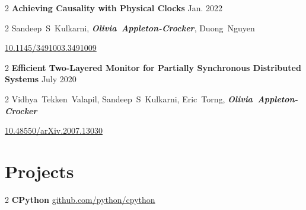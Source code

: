 \documentclass[10pt, letterpaper]{article}
\newenvironment{twocolentry}[2][]{ \onecolentry \def\secondColumn{#2} \setcolumnwidth{\fill, 4.5 cm}
\begin{paracol}{2} }{ \switchcolumn \raggedleft \secondColumn  \end{paracol}
\endonecolentry } %
\newcommand{\sectionoffset}{-0.12 cm}
\newcommand{\ssubsectiongap}{ 0.0953}
\newcommand{\ssubsectiongapd}{\fpeval{2 * \ssubsectiongap}}
\newcommand{\subsectiongap}{\ssubsectiongap cm}
\newcommand{\subsectiongapd}{\ssubsectiongapd cm}
\begin{document}
	\begin{samepage}
		\begin{twocolentry}
			{ Jan. 2022 } \textbf{Achieving Causality with Physical Clocks}
		\end{twocolentry}

		\vspace{\subsectiongap}

		\begin{twocolentry}
            {\href{https://doi.org/10.1145/3491003.3491009}{10.1145/3491003.3491009}}
			\mbox{Sandeep S Kulkarni},
			\mbox{\textbf{\textit{Olivia Appleton-Crocker}}}, \mbox{Duong Nguyen}

			\vspace{\subsectiongap}

			
		\end{twocolentry}
	\end{samepage}

	\vspace{\subsectiongapd}

	\begin{samepage}
		\begin{twocolentry}
			{ July 2020 } \textbf{Efficient Two-Layered Monitor for Partially
			Synchronous Distributed Systems}
		\end{twocolentry}

		\vspace{\subsectiongap}

		\begin{twocolentry}
            {\href{https://doi.org/10.48550/arXiv.2007.13030}{10.48550/arXiv.2007.13030}}
			\mbox{Vidhya Tekken Valapil}, \mbox{Sandeep S Kulkarni}, \mbox{Eric Torng},
			\mbox{\textbf{\textit{Olivia Appleton-Crocker}}}

			\vspace{\subsectiongap}

		\end{twocolentry}
	\end{samepage}

	\vspace{\sectionoffset}

	\section{Projects}

	\begin{twocolentry}
		{ \href{https://github.com/python/cpython}{github.com/python/cpython} } \textbf{CPython}
	\end{twocolentry}
\end{document}
